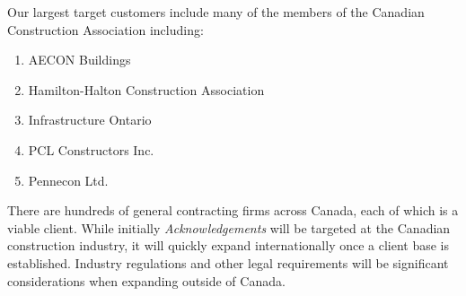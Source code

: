 Our largest target customers include many of the members of the Canadian Construction Association including:

\begin{enumerate}
  \item AECON Buildings
  \item Hamilton-Halton Construction Association
  \item Infrastructure Ontario
  \item PCL Constructors Inc.
  \item Pennecon Ltd.
\end{enumerate}

There are hundreds of general contracting firms across Canada, each of which is a viable client. While initially {\it Acknowledgements} will be targeted at the Canadian construction industry, it will quickly expand internationally once a client base is established. Industry regulations and other legal requirements will be significant considerations when expanding outside of Canada.